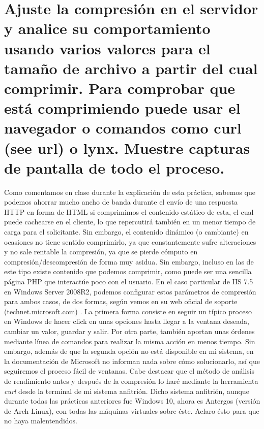 \section{Ajuste la compresión en el servidor y analice su comportamiento usando varios valores para el tamaño de archivo a partir del cual comprimir. Para comprobar que está comprimiendo puede usar el navegador o comandos como curl (see url) o lynx. Muestre capturas de pantalla de todo el proceso.}
Como comentamos en clase durante la explicación de esta práctica, sabemos que podemos ahorrar mucho ancho de banda durante el envío de una respuesta HTTP en forma de HTML si comprimimos el contenido estático de esta, el cual puede cachearse en el cliente, lo que repercutirá también en un menor tiempo de carga para el solicitante. Sin embargo, el contenido dinámico (o cambiante) en ocasiones no tiene sentido comprimirlo, ya que constantemente sufre alteraciones y no sale rentable la compresión, ya que se pierde cómputo en compresión/descompresión de forma muy asidua. Sin embargo, incluso en las de este tipo existe contenido que podemos comprimir, como puede ser una sencilla página PHP que interactúe poco con el usuario.
En el caso particular de IIS 7.5 en Windows Server 2008R2, podemos configurar estos parámetros de compresión para ambos casos, de dos formas, según vemos en su web oficial de soporte (technet.microsoft.com) \cite{compressioniis}. La primera forma consiste en seguir un típico proceso en Windows de hacer click en unas opciones hasta llegar a la ventana deseada, cambiar un valor, guardar y salir. Por otra parte, también aportan unas órdenes mediante línea de comandos para realizar la misma acción en menos tiempo. Sin embargo, además de que la segunda opción no está disponible en mi sistema, en la documentación de Microsoft no informan nada sobre cómo solucionarlo, así que seguiremos el proceso fácil de ventanas.
Cabe destacar que el método de análisis de rendimiento antes y después de la compresión lo haré mediante la herramienta \emph{curl} desde la terminal de mi sistema anfitrión. Dicho sistema anfitrión, aunque durante todas las prácticas anteriores fue Windows 10, ahora es Antergos (versión de Arch Linux), con todas las máquinas virtuales sobre éste. Aclaro ésto para que no haya malentendidos.\\

